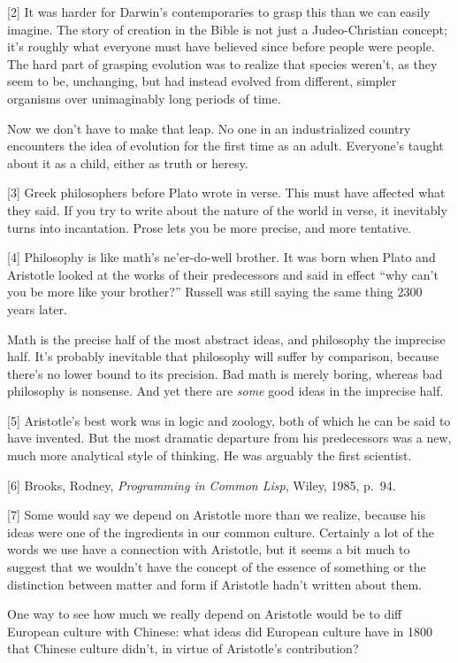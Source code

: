{[}2{]} It was harder for Darwin's contemporaries to grasp this than we
can easily imagine. The story of creation in the Bible is not just a
Judeo-Christian concept; it's roughly what everyone must have believed
since before people were people. The hard part of grasping evolution was
to realize that species weren't, as they seem to be, unchanging, but had
instead evolved from different, simpler organisms over unimaginably long
periods of time.

Now we don't have to make that leap. No one in an industrialized country
encounters the idea of evolution for the first time as an adult.
Everyone's taught about it as a child, either as truth or heresy.

{[}3{]} Greek philosophers before Plato wrote in verse. This must have
affected what they said. If you try to write about the nature of the
world in verse, it inevitably turns into incantation. Prose lets you be
more precise, and more tentative.

{[}4{]} Philosophy is like math's ne'er-do-well brother. It was born
when Plato and Aristotle looked at the works of their predecessors and
said in effect ``why can't you be more like your brother?'' Russell was
still saying the same thing 2300 years later.

Math is the precise half of the most abstract ideas, and philosophy the
imprecise half. It's probably inevitable that philosophy will suffer by
comparison, because there's no lower bound to its precision. Bad math is
merely boring, whereas bad philosophy is nonsense. And yet there are
\emph{some} good ideas in the imprecise half.

{[}5{]} Aristotle's best work was in logic and zoology, both of which he
can be said to have invented. But the most dramatic departure from his
predecessors was a new, much more analytical style of thinking. He was
arguably the first scientist.

{[}6{]} Brooks, Rodney, \emph{Programming in Common Lisp}, Wiley, 1985,
p.~94.

{[}7{]} Some would say we depend on Aristotle more than we realize,
because his ideas were one of the ingredients in our common culture.
Certainly a lot of the words we use have a connection with Aristotle,
but it seems a bit much to suggest that we wouldn't have the concept of
the essence of something or the distinction between matter and form if
Aristotle hadn't written about them.

One way to see how much we really depend on Aristotle would be to diff
European culture with Chinese: what ideas did European culture have in
1800 that Chinese culture didn't, in virtue of Aristotle's contribution?

